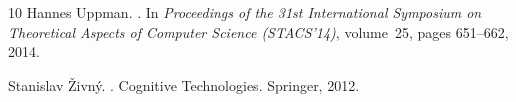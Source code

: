 \documentclass[11pt, reqno]{article}
\theoremstyle{remark}
\begin{document}
\begin{thebibliography}{10}
Hannes Uppman.
.
\newblock In {\em Proceedings of the 31st International Symposium on
  Theoretical Aspects of Computer Science (STACS'14)}, volume~25, pages
  651--662, 2014.

Stanislav {\v{Z}}ivn\'y.
.
\newblock Cognitive Technologies. Springer, 2012.

\end{thebibliography}
\end{document}
